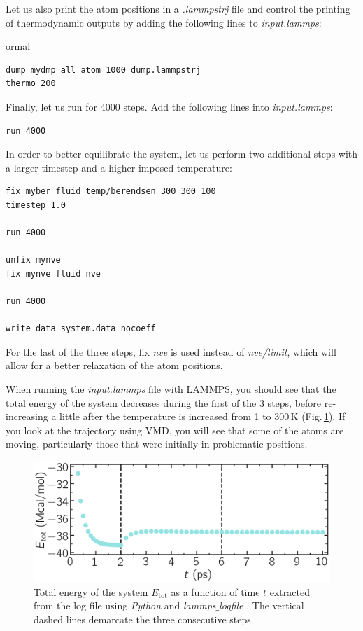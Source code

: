 \documentclass[9pt,tutorial]{livecoms}
\begin{document}
Let us also print the atom positions in a \textit{.lammpstrj} file and control the printing of thermodynamic outputs by adding the following lines to \textit{input.lammps}:
{
ormal \begin{verbatim}
dump mydmp all atom 1000 dump.lammpstrj
thermo 200
\end{verbatim}}
Finally, let us run for 4000 steps. Add the following lines into \textit{input.lammps}:
{\normalsize \begin{verbatim}
run 4000
\end{verbatim}}
In order to better equilibrate the system, let us perform two additional steps with a larger timestep and a higher imposed temperature:
{\normalsize \begin{verbatim}
fix myber fluid temp/berendsen 300 300 100
timestep 1.0

run 4000

unfix mynve
fix mynve fluid nve

run 4000

write_data system.data nocoeff
\end{verbatim}}
For the last of the three steps, fix \textit{nve} is used instead of \textit{nve/limit}, which will allow for a better relaxation of the atom positions.

When running the \textit{input.lammps} file with LAMMPS, you should see that the total energy of the system decreases during the first of the 3 steps, before re-increasing a little after the temperature is increased from 1 to $300\,\text{K}$ (Fig.\,\ref{fig:NANOSHEAR-minimization}). If you look at the trajectory using VMD, you will see that some of the atoms are moving, particularly those that were initially in problematic positions.

\begin{figure}
\centering
\includegraphics[width=\linewidth]{NANOSHEAR-minimization}
\caption{Total energy of the system $E_\text{tot}$ as a function of time $t$ extracted from the log file using \textit{Python} and \textit{lammps$\_$logfile} \cite{sveinsson2021logfile}. The vertical dashed lines demarcate the three consecutive steps.}
\label{fig:NANOSHEAR-minimization}
\end{figure}
\end{document}
